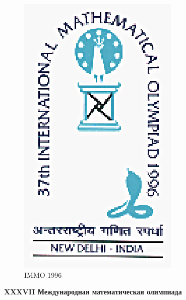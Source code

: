 \documentclass[a4paper,9pt]{article}
\begin{document}
\begin{figure}
    \centering
    \includegraphics[width=0.2\linewidth]{title.eps}
    \caption{IMMO 1996}
    \label{fig:enter-label}
\end{figure}

\begin{center}
    {\LARGE \textbf{XXXVII Международная математическая олимпиада}}
\end{center}
\end{document}
